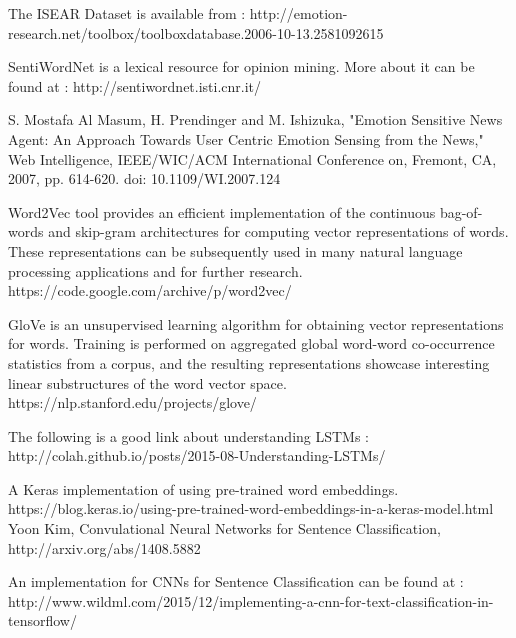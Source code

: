 \documentclass[conference]{IEEEtran}
\numberwithin{equation}{section}
\numberwithin{figure}{section}
\numberwithin{table}{section}
\begin{document}
\begin{thebibliography}{1}
The ISEAR Dataset is available from : http://emotion-research.net/toolbox/toolboxdatabase.2006-10-13.2581092615

SentiWordNet is a lexical resource for opinion mining. More about it can be found at : http://sentiwordnet.isti.cnr.it/

S. Mostafa Al Masum, H. Prendinger and M. Ishizuka, "Emotion Sensitive News Agent: An Approach Towards User Centric Emotion Sensing from the News," Web Intelligence, IEEE/WIC/ACM International Conference on, Fremont, CA, 2007, pp. 614-620.
doi: 10.1109/WI.2007.124

Word2Vec tool provides an efficient implementation of the continuous bag-of-words and skip-gram architectures for computing vector representations of words. These representations can be subsequently used in many natural language processing applications and for further research. https://code.google.com/archive/p/word2vec/

GloVe is an unsupervised learning algorithm for obtaining vector representations for words. Training is performed on aggregated global word-word co-occurrence statistics from a corpus, and the resulting representations showcase interesting linear substructures of the word vector space. https://nlp.stanford.edu/projects/glove/

The following is a good link about understanding LSTMs : http://colah.github.io/posts/2015-08-Understanding-LSTMs/

A Keras implementation of using pre-trained word embeddings.
https://blog.keras.io/using-pre-trained-word-embeddings-in-a-keras-model.html
Yoon Kim, Convulational Neural Networks for Sentence Classification, http://arxiv.org/abs/1408.5882

An implementation for CNNs for Sentence Classification can be found at : http://www.wildml.com/2015/12/implementing-a-cnn-for-text-classification-in-tensorflow/

\end{thebibliography}

% 
\end{document}
